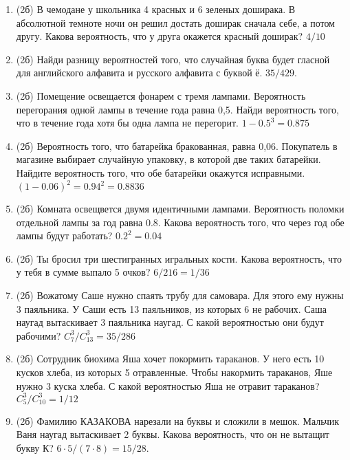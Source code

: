\documentclass[a4paper, 12pt]{article}
\begin{document}
\newpage
\begin{enumerate}
\item (2б) В чемодане у школьника 4 красных и 6 зеленых доширака. В абсолютной темноте ночи он решил достать доширак сначала себе, а потом другу. 
Какова вероятность, что у друга окажется красный доширак? $4/10$
\item (2б) Найди разницу вероятностей того, что случайная буква будет гласной для английского алфавита и русского алфавита с буквой ё. $35/429$.
\item (2б) Помещение освещается фонарем с тремя лампами. Вероятность перегорания одной лампы в течение года равна 0,5. Найди вероятность того, 
что в течение года хотя бы одна лампа не перегорит. $1-0.5^3 = 0.875$
\item (2б) Вероятность того, что батарейка бракованная, равна 0,06. Покупатель в магазине выбирает случайную упаковку, в которой две таких батарейки. 
Найдите вероятность того, что обе батарейки окажутся исправными. $(1-0.06)^2 = 0.94^2 = 0.8836$
\item (2б) Комната освещвется двумя идентичными лампами. Вероятность поломки отдельной лампы за год равна 0.8. Какова вероятность того, 
что через год обе лампы будут работать? $0.2^2=0.04$ 
\item (2б) Ты бросил три шестигранных игральных кости. Какова вероятность, что у тебя в сумме выпало 5 очков? $6/216=1/36$
\item (2б) Вожатому Саше нужно спаять трубу для самовара. Для этого ему нужны 3 паяльника. У Саши есть 13 паяльников, из которых 6 не рабочих.  
Саша наугад вытаскивает 3 паяльника наугад. С какой вероятностью они будут рабочими? $C_{7}^3/C_{13}^3 = 35/286$
\item (2б) Сотрудник биохима Яша хочет покормить тараканов. У него есть 10 кусков хлеба, из которых 5 отравленные. Чтобы накормить тараканов, 
Яше нужно 3 куска хлеба. С какой вероятностью Яша не отравит тараканов?  $C_5^3/C_{10}^3 = 1/12$

\item (2б) Фамилию КАЗАКОВА нарезали на буквы и сложили в мешок. Мальчик Ваня наугад вытаскивает 2 буквы. 
Какова вероятность, что он не вытащит букву К? $6\cdot 5/(7\cdot 8) = 15/28$.



\end{enumerate}
\end{document}
